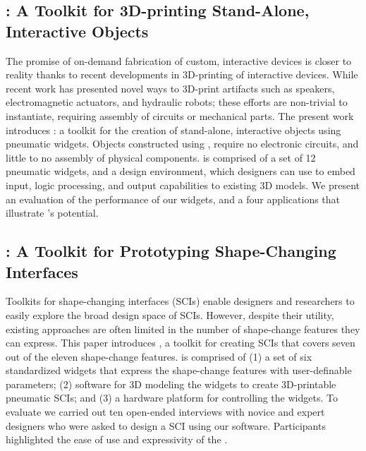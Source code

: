     \subsection*{\al: A Toolkit for 3D-printing Stand-Alone, Interactive Objects}
      The promise of on-demand fabrication of custom, interactive devices is
      closer to reality thanks to recent developments in 3D-printing of
      interactive devices. While recent work has presented novel ways to
      3D-print artifacts such as speakers, electromagnetic actuators, and
      hydraulic robots; these efforts are non-trivial to instantiate,
      requiring assembly of circuits or mechanical parts. The present work
      introduces \al: a toolkit for the creation of stand-alone,
      interactive objects using pneumatic widgets. Objects constructed using
      \al, require no electronic circuits, and little to no assembly of
      physical components. \al is comprised of a set of 12 pneumatic
      widgets, and a design environment, which designers can use to embed
      input, logic processing, and output capabilities to existing 3D models.
      We present an evaluation of the performance of our widgets, and a four
      applications that illustrate \al's potential.

    \newpage
    \subsection*{\mp: A Toolkit for Prototyping Shape-Changing
      Interfaces}
      Toolkits for shape-changing interfaces (SCIs) enable designers and
      researchers to easily explore the broad design space of SCIs. However,
      despite their utility, existing approaches are often limited in the
      number of shape-change features they can express. This paper introduces
      \mp, a toolkit for creating SCIs that covers seven out of the
      eleven shape-change features. \mp is comprised of (1) a set
      of six standardized widgets that express the shape-change features with
      user-definable parameters; (2) software for 3D modeling the widgets to
      create 3D-printable pneumatic SCIs; and (3) a hardware platform for
      controlling the widgets. To evaluate \mp we carried out ten
      open-ended interviews with novice and expert designers who were asked
      to design a SCI using our software. Participants highlighted the ease
      of use and expressivity of the \mp.